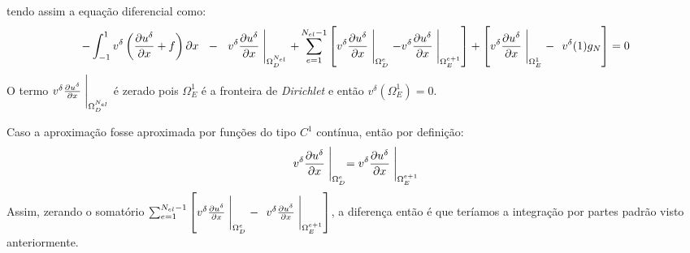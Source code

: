 tendo assim a equação diferencial como:
\begin{align}
-\int^1_{-1} v^\delta\left (\frac{\partial u^\delta}{\partial x} + f  \right ) \partial x \ \
 -\ \   v^\delta \frac{\partial u^\delta}{\partial x}\Biggm\lvert_{\Omega^{N_{el}}_D}
+\sum^{{N_{el} -1}}_{e=1} \left [ v^\delta \frac{\partial u^\delta}{\partial x}\Biggm\lvert_{\Omega^e_D} -  v^\delta \frac{\partial u^\delta}{\partial x}\Biggm\lvert_{\Omega^{e+ 1}_E}    \right ] 
+  \left [  v^\delta \frac{\partial u^\delta}{\partial x}\Biggm\lvert_{\Omega^{1}_E}  -\ \ v^\delta(1)g_N \right ] = 0 
\end{align}
 O termo $ v^\delta \frac{\partial u^\delta}{\partial x}\Biggm\lvert_{\Omega^{N_{el}}_D}$ é zerado pois $\Omega^1_E$ é a fronteira de \emph{Dirichlet} e então $v^\delta(\Omega^1_E)=0$.

 Caso a aproximação fosse aproximada por funções do tipo $C^1$ contínua, então por definição:
 \begin{equation}
  v^\delta\frac{\partial u^\delta}{\partial x} \Biggm\lvert_{\Omega^e_D} =  v^\delta\frac{\partial u^\delta}{\partial x} \Biggm\lvert_{\Omega^{e+1}_E} 
 \end{equation}
 Assim, zerando o somatório $\sum^{{N_{el} -1}}_{e=1} \left [ v^\delta \frac{\partial u^\delta}{\partial x}\Biggm\lvert_{\Omega^e_D} -\ \  v^\delta \frac{\partial u^\delta}{\partial x}\Biggm\lvert_{\Omega^{e+ 1}_E}    \right ] 
$, a diferença então é que teríamos a integração por partes padrão visto anteriormente.

